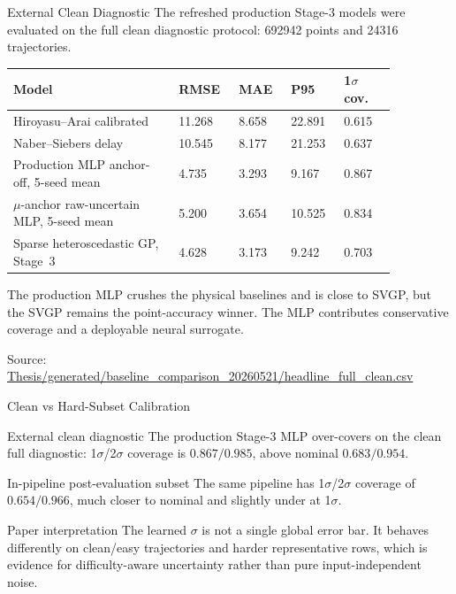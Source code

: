 \documentclass[UTF8,aspectratio=169]{ctexbeamer}
\newcommand{\good}[1]{\textcolor{green!45!black}{#1}}
\newcommand{\src}[1]{\vfill{\tiny\textcolor{gray!75!black}{Source: \url{#1}}}}
\begin{document}
\begin{frame}{External Clean Diagnostic}
\small
The refreshed production Stage-3 models were evaluated on the full clean diagnostic protocol:
\num{692942} points and \num{24316} trajectories.

\vspace{0.35em}
\begin{center}
\begin{tabular}{L{0.38\linewidth}R{0.12\linewidth}R{0.12\linewidth}R{0.12\linewidth}R{0.12\linewidth}}
\toprule
Model & RMSE & MAE & P95 & 1\(\sigma\) cov. \\
\midrule
Hiroyasu--Arai calibrated & 11.268 & 8.658 & 22.891 & 0.615 \\
Naber--Siebers delay & 10.545 & 8.177 & 21.253 & 0.637 \\
\good{Production MLP anchor-off, 5-seed mean} & \good{4.735} & 3.293 & \good{9.167} & \good{0.867} \\
\(\mu\)-anchor raw-uncertain MLP, 5-seed mean & 5.200 & 3.654 & 10.525 & 0.834 \\
Sparse heteroscedastic GP, Stage~3 & \good{4.628} & \good{3.173} & 9.242 & 0.703 \\
\bottomrule
\end{tabular}
\end{center}

\vspace{0.25em}
The production MLP crushes the physical baselines and is close to SVGP, but the
SVGP remains the point-accuracy winner. The MLP contributes conservative
coverage and a deployable neural surrogate.

\src{Thesis/generated/baseline_comparison_20260521/headline_full_clean.csv}
\end{frame}

\begin{frame}{Clean vs Hard-Subset Calibration}
\small
\begin{block}{External clean diagnostic}
The production Stage-3 MLP over-covers on the clean full diagnostic:
1\(\sigma\)/2\(\sigma\) coverage is \(0.867/0.985\), above nominal \(0.683/0.954\).
\end{block}

\begin{block}{In-pipeline post-evaluation subset}
The same pipeline has 1\(\sigma\)/2\(\sigma\) coverage of \(0.654/0.966\), much closer to nominal and slightly under at 1\(\sigma\).
\end{block}

\begin{block}{Paper interpretation}
The learned \(\sigma\) is not a single global error bar. It behaves differently on clean/easy trajectories and harder representative rows, which is evidence for difficulty-aware uncertainty rather than pure input-independent noise.
\end{block}
\end{frame}
\end{document}
